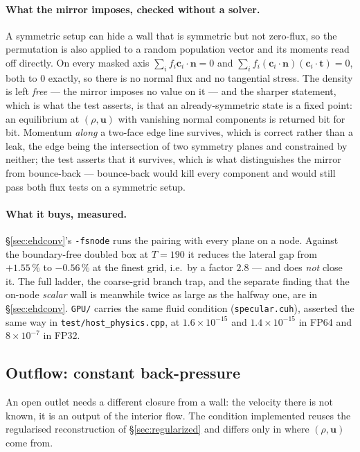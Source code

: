 \documentclass[11pt,a4paper]{article}
\newcommand{\code}[1]{\texttt{\small #1}}
\newcommand{\uu}{\bm{u}}
\newcommand{\nn}{\bm{n}}
\begin{document}
\paragraph{What the mirror imposes, checked without a solver.} A symmetric setup
can hide a wall that is symmetric but not zero-flux, so the permutation is also
applied to a random population vector and its moments read off directly. On every
masked axis $\sum_i f_i \bm{c}_i\!\cdot\!\nn = 0$ and $\sum_i f_i
(\bm{c}_i\!\cdot\!\nn)(\bm{c}_i\!\cdot\!\bm{t}) = 0$, both to $0$ exactly, so
there is no normal flux and no tangential stress. The density is left \emph{free}
--- the mirror imposes no value on it --- and the sharper statement, which is what
the test asserts, is that an already-symmetric state is a fixed point: an
equilibrium at $(\rho,\uu)$ with vanishing normal components is returned bit for
bit. Momentum \emph{along} a two-face edge line survives, which is correct rather
than a leak, the edge being the intersection of two symmetry planes and
constrained by neither; the test asserts that it survives, which is what
distinguishes the mirror from bounce-back --- bounce-back would kill every
component and would still pass both flux tests on a symmetric setup.

\paragraph{What it buys, measured.} \S\ref{sec:ehdconv}'s \code{-fsnode} runs
the pairing with every plane on a node. Against the boundary-free doubled box at
$T=190$ it reduces the lateral gap from $+1.55\,\%$ to $-0.56\,\%$ at the finest
grid, i.e.\ by a factor $2.8$ --- and does \emph{not} close it. The full ladder,
the coarse-grid branch trap, and the separate finding that the on-node
\emph{scalar} wall is meanwhile twice as large as the halfway one, are in
\S\ref{sec:ehdconv}. \code{GPU/} carries the same fluid condition
(\code{specular.cuh}), asserted the same way in \code{test/host\_physics.cpp},
at $1.6\times10^{-15}$ and $1.4\times10^{-15}$ in FP64 and $8\times10^{-7}$ in
FP32.

\subsection{Outflow: constant back-pressure}
\label{sec:outflow}

An open outlet needs a different closure from a wall: the velocity there is not
known, it is an output of the interior flow. The condition implemented reuses
the regularised reconstruction of \S\ref{sec:regularized} and differs only in
where $(\rho,\uu)$ come from.
\end{document}
